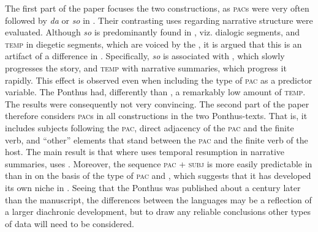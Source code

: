 \documentclass[output=paper,colorlinks,citecolor=brown]{langscibook}
\begin{document}
The first part of the paper focuses the two  constructions, as \textsc{pac}s were very often followed by \textit{da} or \textit{so} in . Their contrasting uses regarding narrative structure were evaluated. Although \textit{so} is predominantly found in , viz. dialogic segments, and \textsc{temp} in diegetic segments, which are voiced by the , it is argued that this is an artifact of a difference in . Specifically, \textit{so} is associated with , which slowly progresses the story, and \textsc{temp} with narrative summaries, which progress it rapidly. This effect is observed even when including the type of \textsc{pac} as a predictor variable. 
The  Ponthus had, differently than , a remarkably low amount of \textsc{temp}. The results were consequently not very convincing. The second part of the paper therefore considers \textsc{pac}s in all constructions in the two Ponthus-texts. That is, it includes subjects following the \textsc{pac}, direct adjacency of the \textsc{pac} and the finite verb, and ``other'' elements that stand between the \textsc{pac} and the finite verb of the host. The main result is that where  uses temporal resumption in narrative summaries,  uses . Moreover, the sequence \textsc{pac} + \textsc{subj} is more easily predictable in  than in  on the basis of the type of \textsc{pac} and , which suggests that it has developed its own niche in . Seeing that the  Ponthus was published about a century later than the  manuscript, the differences between the languages may be a reflection of a larger diachronic development, but to draw any reliable conclusions other types of data will need to be considered.
\end{document}
